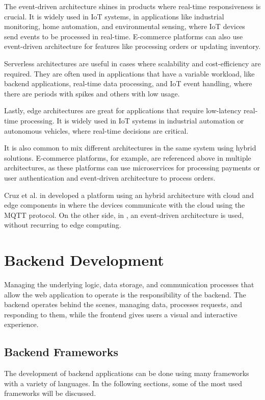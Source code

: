The event-driven architecture shines in products where real-time
responsiveness is crucial. It is widely used in \gls{IoT} systems, in
applications like industrial monitoring, home automation, and environmental
sensing, where \gls{IoT} devices send events to be processed in real-time.
E-commerce platforms can also use event-driven architecture for
features like processing orders or updating inventory.

Serverless architectures are useful in cases where scalability and cost-efficiency
are required. They are often used in applications that have a variable workload,
like backend applications, real-time data processing, and \gls{IoT} event handling, where
there are periods with spikes and others with low usage.

Lastly, edge architectures are great for applications that require low-latency
real-time processing. It is widely used in \gls{IoT} systems in industrial
automation or autonomous vehicles, where real-time decisions are critical.

It is also common to mix different architectures in the same system using
hybrid solutions. E-commerce platforms, for example, are referenced above in
multiple architectures, as these platforms can use microservices for processing
payments or user authentication and event-driven architecture to process orders.

Cruz et al. in \cite{s22155866} developed a platform using an hybrid architecture
with cloud and edge components in where the devices communicate with
the cloud using the \gls{MQTT} protocol. On the other side, in \cite{lopez},
an event-driven architecture is used, without recurring to edge computing.

\section{Backend Development}
Managing the underlying logic, data storage, and communication processes that
allow the web application to operate is the responsibility of the backend.
The backend operates behind the scenes, managing data, processes requests, and
responding to them, while the frontend gives users a visual and interactive
experience.
\subsection{Backend Frameworks}
The development of backend applications can be done using many frameworks with
a variety of languages. In the following sections, some of the most used
frameworks will be discussed.
